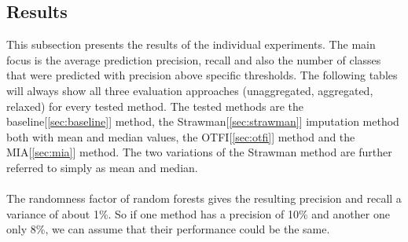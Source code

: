 \documentclass[11pt]{article}
\begin{document}
    \subsection{Results}
      This subsection presents the results of the individual experiments. The main focus is the average prediction precision, recall and also the number of classes that were predicted with precision above specific thresholds. The following tables will always show all three evaluation approaches (unaggregated, aggregated, relaxed) for every tested method. The tested methods are the baseline[\ref{sec:baseline}] method, the Strawman[\ref{sec:strawman}] imputation method both with mean and median values, the OTFI[\ref{sec:otfi}] method and the MIA[\ref{sec:mia}] method. The two variations of the Strawman method are further referred to simply as mean and median.
      \\~\\
      The randomness factor of random forests gives the resulting precision and recall a variance of about 1\%. So if one method has a precision of 10\% and another one only 8\%, we can assume that their performance could be the same.
\end{document}
